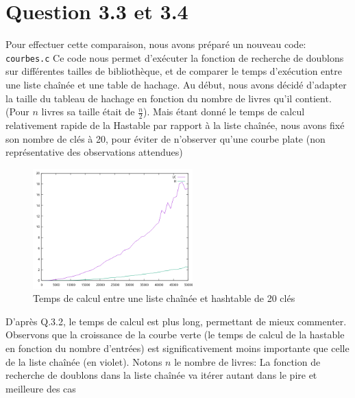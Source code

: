 \documentclass{article}
\begin{document}
    \newpage
    \section{Question 3.3 et 3.4}
    
    Pour effectuer cette comparaison, nous avons préparé un nouveau code: 
    \texttt{courbes.c}
    \newline
    Ce code nous permet d'exécuter la fonction de recherche de doublons sur 
    différentes tailles de bibliothèque, et de comparer le temps d'exécution
    entre une liste chaînée et une table de hachage.
    \newline
    Au début, nous avons décidé d'adapter la taille du tableau de hachage en
    fonction du nombre de livres qu'il contient. (Pour $n$ livres sa taille
    était de $\frac{n}{2}$). 
    \newline
    Mais étant donné le temps de calcul relativement rapide de la Hastable
    par rapport à la liste chaînée, nous avons fixé son nombre de clés à 20,
    pour éviter de n'observer qu'une courbe plate (non représentative des 
    observations attendues)
    \begin{figure}[h]
        \centering
        \includegraphics[width=0.55\textwidth]{graph.png}
        \caption{Temps de calcul entre une liste chaînée et hashtable de 20 clés}
        \label{fig:hash20}
    \end{figure}
    \newline
    D'après Q.3.2, le temps de calcul est plus long, permettant de mieux commenter.
    \newline
    Observons que la croissance de la courbe verte (le temps de calcul de la hastable en fonction du nombre d'entrées)
     est significativement moins importante que
    celle de la liste chaînée (en violet). 
    \newline
    Notons $n$ le nombre de livres: La fonction
    de recherche de doublons dans la liste chaînée va itérer autant dans le pire et meilleure des cas
\end{document}
